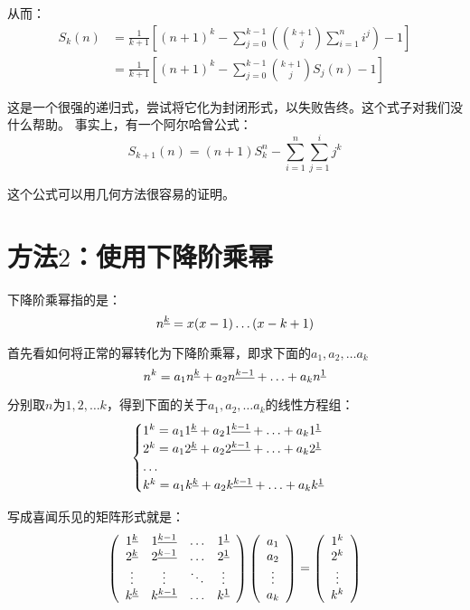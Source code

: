\documentclass{article}
\begin{document}
\begin{CJK*}{UTF8}{gbsn}
从而：
\[
\begin{aligned}
S_k(n)	& = \frac{1}{k + 1} \left[ (n + 1)^k - \sum_{j = 0}^{k - 1} \left( \binom {k + 1} j \sum_{i = 1}^n i^j \right) - 1 \right] \\
		& = \frac{1}{k + 1} \left[ (n + 1)^k - \sum_{j = 0}^{k - 1} \binom {k + 1} j S_j(n) - 1 \right]
\end{aligned}
\]

这是一个很强的递归式，尝试将它化为封闭形式，以失败告终。这个式子对我们没什么帮助。
事实上，有一个阿尔哈曾公式：
\[
S_{k + 1}(n) = (n + 1)S_k^n - \sum_{i = 1}^n \sum_{j = 1}^i j^k
\]

这个公式可以用几何方法很容易的证明。

\section{方法$2$：使用下降阶乘幂}
下降阶乘幂指的是：
\[
{n}^{\underline{k}} = x(x - 1)\ldots(x - k + 1)
\]

首先看如何将正常的幂转化为下降阶乘幂，即求下面的$a_1, a_2, \ldots a_k$
\[
n^k = a_1{n}^{\underline{k}} + a_2{n}^{\underline{k - 1}} + \ldots + a_k{n}^{\underline{1}}
\]

分别取$n$为$1, 2, \ldots k$，得到下面的关于$a_1, a_2, \ldots a_k$的线性方程组：
\[
\begin{cases}
1^k = a_1{1}^{\underline{k}} + a_2{1}^{\underline{k - 1}} + \ldots + a_k{1}^{\underline{1}} \\
2^k = a_1{2}^{\underline{k}} + a_2{2}^{\underline{k - 1}} + \ldots + a_k{2}^{\underline{1}} \\
\ldots \\
k^k = a_1{k}^{\underline{k}} + a_2{k}^{\underline{k - 1}} + \ldots + a_k{k}^{\underline{1}} \\
\end{cases}
\]

写成喜闻乐见的矩阵形式就是：
\[
\left(
\begin{array}{cccc}
{1}^{\underline{k}} & {1}^{\underline{k - 1}} & \ldots & {1}^{\underline{1}} \\
{2}^{\underline{k}} & {2}^{\underline{k - 1}} & \ldots & {2}^{\underline{1}} \\
\vdots & \vdots & \ddots & \vdots \\
{k}^{\underline{k}} & {k}^{\underline{k - 1}} & \ldots & {k}^{\underline{1}} \\
\end{array}
\right)
\left( \begin{array}{c} {a}_1 \\ {a}_2 \\ \vdots \\ {a}_{k} \end{array} \right) =
\left(
\begin{array}{c}
1^k \\ 2^k \\ \vdots \\ k^k
\end{array}
\right)
\]


\end{CJK*}
\end{document}
